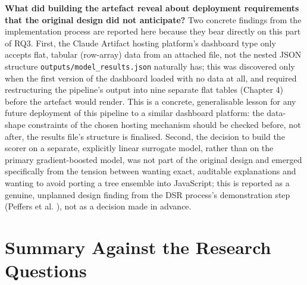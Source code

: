 \documentclass[12pt,oneside]{report}
\begin{document}
\textbf{What did building the artefact reveal about deployment
requirements that the original design did not anticipate?} Two concrete
findings from the implementation process are reported here because they
bear directly on this part of RQ3. First, the Claude Artifact hosting
platform's dashboard type only accepts flat, tabular (row-array) data
from an attached file, not the nested JSON structure
\texttt{outputs/model\_results.json} naturally has; this was discovered
only when the first version of the dashboard loaded with no data at all,
and required restructuring the pipeline's output into nine separate flat
tables (Chapter 4) before the artefact would render. This is a concrete,
generalisable lesson for any future deployment of this pipeline to a
similar dashboard platform: the data-shape constraints of the chosen
hosting mechanism should be checked before, not after, the results
file's structure is finalised. Second, the decision to build the scorer
on a separate, explicitly linear surrogate model, rather than on the
primary gradient-boosted model, was not part of the original design and
emerged specifically from the tension between wanting exact, auditable
explanations and wanting to avoid porting a tree ensemble into
JavaScript; this is reported as a genuine, unplanned design finding from
the DSR process's demonstration step (Peffers et al.
\citeyearpar{peffers2007design}), not as a decision made in advance.

\hypertarget{summary-against-the-research-questions}{%
\section{Summary Against the Research
Questions}\label{summary-against-the-research-questions}}
\end{document}

